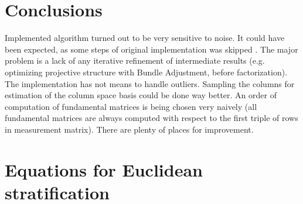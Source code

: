 \documentclass[12pt]{article}
\begin{document}
\section{Conclusions}

Implemented algorithm turned out to be very sensitive to noise. It could have been expected, as some steps of original implementation was skipped \cite{svoboda05}. The major problem is a lack of any iterative refinement of intermediate results (e.g. optimizing projective structure with Bundle Adjustment, before factorization). The implementation has not means to handle outliers. Sampling the columns for estimation of the column space basis could be done way better. An order of computation of fundamental matrices is being chosen very naively (all fundamental matrices are always computed with respect to the first triple of rows in measurement matrix). There are plenty of places for improvement.




\newpage

\section{Equations for Euclidean stratification}
\end{document}
